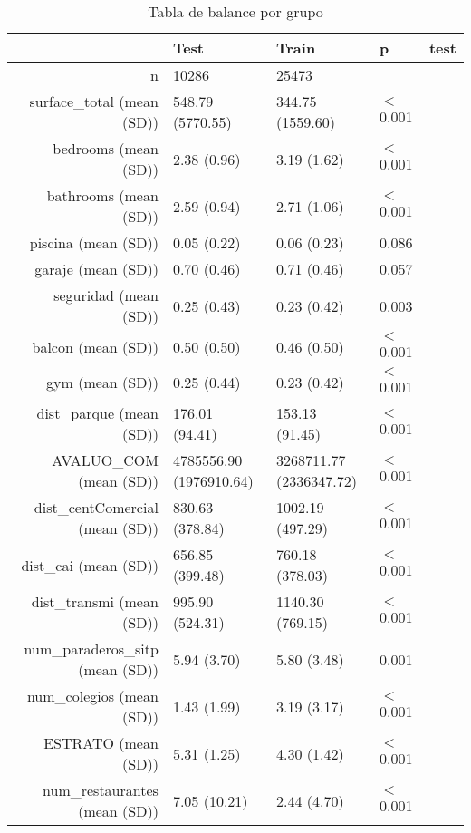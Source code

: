 \begin{table}[ht]
\centering
\begin{tabular}{rllll}
  \hline
 & Test & Train & p & test \\ 
  \hline
n &      10286 &      25473 &  &  \\ 
  surface\_total (mean (SD)) &     548.79 (5770.55) &     344.75 (1559.60) & $<$0.001 &  \\ 
  bedrooms (mean (SD)) &       2.38 (0.96) &       3.19 (1.62) & $<$0.001 &  \\ 
  bathrooms (mean (SD)) &       2.59 (0.94) &       2.71 (1.06) & $<$0.001 &  \\ 
  piscina (mean (SD)) &       0.05 (0.22) &       0.06 (0.23) &  0.086 &  \\ 
  garaje (mean (SD)) &       0.70 (0.46) &       0.71 (0.46) &  0.057 &  \\ 
  seguridad (mean (SD)) &       0.25 (0.43) &       0.23 (0.42) &  0.003 &  \\ 
  balcon (mean (SD)) &       0.50 (0.50) &       0.46 (0.50) & $<$0.001 &  \\ 
  gym (mean (SD)) &       0.25 (0.44) &       0.23 (0.42) & $<$0.001 &  \\ 
  dist\_parque (mean (SD)) &     176.01 (94.41) &     153.13 (91.45) & $<$0.001 &  \\ 
  AVALUO\_COM (mean (SD)) & 4785556.90 (1976910.64) & 3268711.77 (2336347.72) & $<$0.001 &  \\ 
  dist\_centComercial (mean (SD)) &     830.63 (378.84) &    1002.19 (497.29) & $<$0.001 &  \\ 
  dist\_cai (mean (SD)) &     656.85 (399.48) &     760.18 (378.03) & $<$0.001 &  \\ 
  dist\_transmi (mean (SD)) &     995.90 (524.31) &    1140.30 (769.15) & $<$0.001 &  \\ 
  num\_paraderos\_sitp (mean (SD)) &       5.94 (3.70) &       5.80 (3.48) &  0.001 &  \\ 
  num\_colegios (mean (SD)) &       1.43 (1.99) &       3.19 (3.17) & $<$0.001 &  \\ 
  ESTRATO (mean (SD)) &       5.31 (1.25) &       4.30 (1.42) & $<$0.001 &  \\ 
  num\_restaurantes (mean (SD)) &       7.05 (10.21) &       2.44 (4.70) & $<$0.001 &  \\ 
   \hline
\end{tabular}
\caption{Tabla de balance por grupo} 
\end{table}
